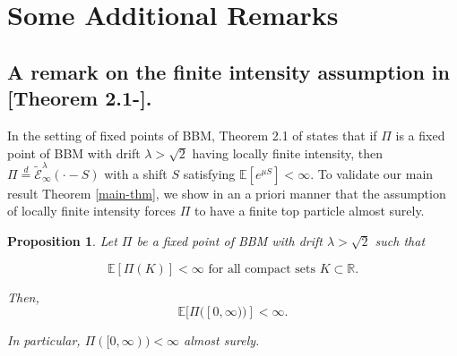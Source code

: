 \documentclass[a4paper,reqno]{amsart}%
\newcommand{\R}{\mathbb{R}}
\newcommand{\1}{\mathbf 1}
\theoremstyle{mine}
\numberwithin{theorem}{section}
\newtheorem{proposition}[theorem]{Proposition}
\numberwithin{equation}{section}
\theoremstyle{remark}
\begin{document}
\section{Some Additional Remarks}\label{Section Additional remarks}


\subsection{A remark on the finite intensity assumption in [Theorem 2.1-\cite{Kabluchko}].}\label{discussion-on-finite-intensity-vs-top-particle}

In the setting of fixed points of BBM, Theorem 2.1 of \cite{Kabluchko} states that if $\Pi$ is a fixed point of BBM with drift $\lambda >\sqrt{2}$ having locally finite intensity, then $\Pi \overset{d}{=} \widetilde{\mathcal{E}}_\infty^\lambda(\cdot-S)$ with a shift $S$ satisfying $\mathbb{E}[e^{\mu S}] <\infty$. To validate our main result Theorem \ref{main-thm}, we show in an a priori manner that the assumption of locally finite intensity forces $\Pi$ to have a finite top particle almost surely. 



\begin{proposition}\label{Prop_intensity implies top particle}
Let $\Pi$ be a fixed point of BBM with drift $\lambda>\sqrt 2$ such that  

\begin{equation}\label{Pi-satisfies-on-compacts}
    \mathbb{E}[\Pi(K)] < \infty \textrm{ for all compact sets } K\subset \R. 
\end{equation}

Then,
\begin{equation}\label{Pi-satisfies-one-sided}
     \mathbb{E}[\Pi([0, \infty))] < \infty.
\end{equation}

In particular, $\Pi([0,\infty)) < \infty$ almost surely.  

\end{proposition}
\end{document}

